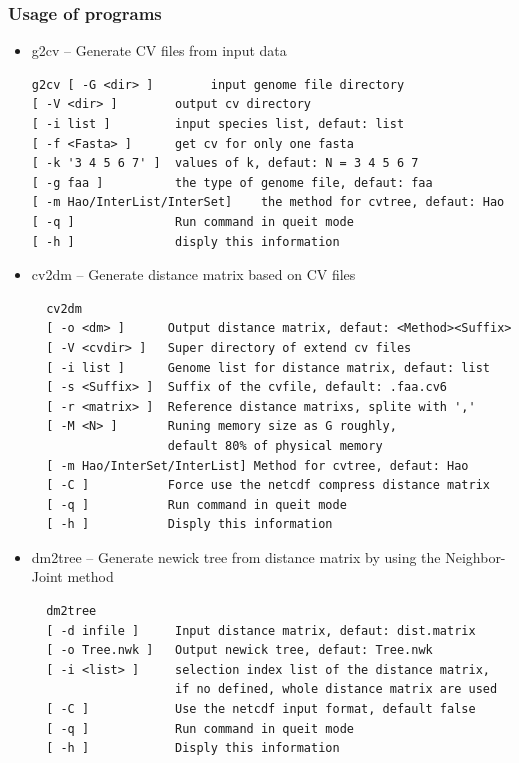 \documentclass[a4paper,12pt]{article}
\begin{document}
\subsubsection{Usage of programs}
\begin{itemize}\itemsep 0pt
	\item g2cv -- Generate CV files from input data
	\begin{verbatim}
g2cv [ -G <dir> ]        input genome file directory
[ -V <dir> ]        output cv directory
[ -i list ]         input species list, defaut: list
[ -f <Fasta> ]      get cv for only one fasta
[ -k '3 4 5 6 7' ]  values of k, defaut: N = 3 4 5 6 7
[ -g faa ]          the type of genome file, defaut: faa
[ -m Hao/InterList/InterSet]    the method for cvtree, defaut: Hao
[ -q ]              Run command in queit mode
[ -h ]              disply this information
\end{verbatim}

	\item cv2dm -- Generate distance matrix based on CV files
	\begin{verbatim}
  cv2dm
  [ -o <dm> ]      Output distance matrix, defaut: <Method><Suffix>
  [ -V <cvdir> ]   Super directory of extend cv files
  [ -i list ]      Genome list for distance matrix, defaut: list
  [ -s <Suffix> ]  Suffix of the cvfile, default: .faa.cv6
  [ -r <matrix> ]  Reference distance matrixs, splite with ','
  [ -M <N> ]       Runing memory size as G roughly,
                   default 80% of physical memory
  [ -m Hao/InterSet/InterList] Method for cvtree, defaut: Hao
  [ -C ]           Force use the netcdf compress distance matrix
  [ -q ]           Run command in queit mode
  [ -h ]           Disply this information
\end{verbatim}

	\item dm2tree -- Generate newick tree from distance matrix by
	using the Neighbor-Joint method
	\begin{verbatim}
  dm2tree
  [ -d infile ]     Input distance matrix, defaut: dist.matrix
  [ -o Tree.nwk ]   Output newick tree, defaut: Tree.nwk
  [ -i <list> ]     selection index list of the distance matrix,
                    if no defined, whole distance matrix are used
  [ -C ]            Use the netcdf input format, default false
  [ -q ]            Run command in queit mode
  [ -h ]            Disply this information
\end{verbatim}
\end{itemize}
\end{document}
